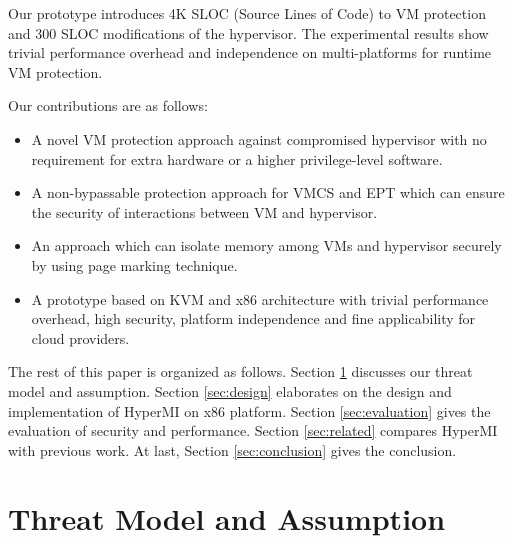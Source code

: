 \documentclass[conference]{IEEEtran}
\begin{document}
Our prototype introduces 4K SLOC (Source Lines of Code) to VM protection and 300 SLOC modifications of the hypervisor.
The experimental results show trivial performance overhead and independence on multi-platforms for runtime VM protection. 


Our contributions are as follows:
\begin{itemize}
\item{A novel VM protection approach against compromised hypervisor with no requirement for extra hardware or a higher privilege-level software.} 

\item{A non-bypassable protection approach for VMCS and EPT which can ensure the security of interactions between VM and hypervisor.}
\item{An approach which can isolate memory among VMs and hypervisor securely by using page marking technique.}%

\item{A prototype based on KVM and x86 architecture with trivial performance overhead, high security, platform independence and fine applicability  for cloud providers.}

\end{itemize}
The rest of this paper is organized as follows. Section \ref{sec:threat} discusses our threat model and assumption. Section \ref{sec:design} elaborates on the design and implementation of HyperMI on x86 platform. Section \ref{sec:evaluation} gives the evaluation of security and performance. Section \ref{sec:related} compares HyperMI with previous work. At last, Section \ref{sec:conclusion} gives the conclusion.
 



\section{Threat Model and Assumption}\label{sec:threat}
\end{document}

